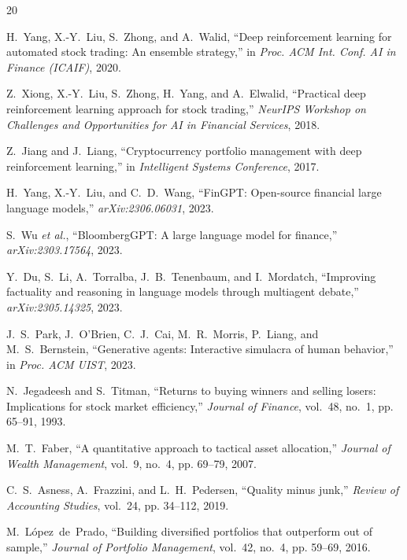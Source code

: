 \documentclass[10pt,twocolumn]{IEEEtran}
\begin{document}
\begin{thebibliography}{20}

H.~Yang, X.-Y.~Liu, S.~Zhong, and A.~Walid, ``Deep reinforcement learning
for automated stock trading: An ensemble strategy,'' in \emph{Proc. ACM
Int. Conf. AI in Finance (ICAIF)}, 2020.

Z.~Xiong, X.-Y.~Liu, S.~Zhong, H.~Yang, and A.~Elwalid, ``Practical deep
reinforcement learning approach for stock trading,'' \emph{NeurIPS Workshop
on Challenges and Opportunities for AI in Financial Services}, 2018.

Z.~Jiang and J.~Liang, ``Cryptocurrency portfolio management with deep
reinforcement learning,'' in \emph{Intelligent Systems Conference}, 2017.

H.~Yang, X.-Y.~Liu, and C.~D.~Wang, ``FinGPT: Open-source financial large
language models,'' \emph{arXiv:2306.06031}, 2023.

S.~Wu \emph{et al.}, ``BloombergGPT: A large language model for finance,''
\emph{arXiv:2303.17564}, 2023.

Y.~Du, S.~Li, A.~Torralba, J.~B.~Tenenbaum, and I.~Mordatch, ``Improving
factuality and reasoning in language models through multiagent debate,''
\emph{arXiv:2305.14325}, 2023.

J.~S.~Park, J.~O'Brien, C.~J.~Cai, M.~R.~Morris, P.~Liang, and
M.~S.~Bernstein, ``Generative agents: Interactive simulacra of human
behavior,'' in \emph{Proc. ACM UIST}, 2023.

N.~Jegadeesh and S.~Titman, ``Returns to buying winners and selling losers:
Implications for stock market efficiency,'' \emph{Journal of Finance},
vol.~48, no.~1, pp. 65--91, 1993.

M.~T.~Faber, ``A quantitative approach to tactical asset allocation,''
\emph{Journal of Wealth Management}, vol.~9, no.~4, pp. 69--79, 2007.

C.~S.~Asness, A.~Frazzini, and L.~H.~Pedersen, ``Quality minus junk,''
\emph{Review of Accounting Studies}, vol.~24, pp. 34--112, 2019.

M.~L\'opez~de~Prado, ``Building diversified portfolios that outperform
out of sample,'' \emph{Journal of Portfolio Management}, vol.~42, no.~4,
pp. 59--69, 2016.


\end{thebibliography}
\end{document}
